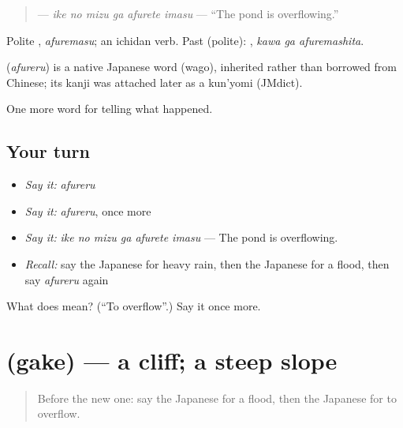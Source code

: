 \begin{quote}
\textbf{  } — \emph{ike no mizu ga afurete imasu} — \textquotedblleft{}The pond is overflowing.\textquotedblright{}
\end{quote}

Polite \textbf{}, \emph{afuremasu}; an ichidan verb. Past (polite): \textbf{ }, \emph{kawa ga afuremashita}.

\begin{cousinweb}
\textbf{} (\emph{afureru}) is a native Japanese word (wago), inherited rather than borrowed from Chinese; its kanji was attached later as a kun'yomi (JMdict).
\end{cousinweb}

\begin{grammarlens}[title={What you've built}]
One more word for telling what happened.
\end{grammarlens}

\subsection*{Your turn}
\begin{itemize}
\raggedright
  \item \emph{Say it:} \emph{afureru}
  \item \emph{Say it:} \emph{afureru}, once more
  \item \emph{Say it:} \emph{ike no mizu ga afurete imasu} — The pond is overflowing.
  \item \emph{Recall:} say the Japanese for heavy rain, then the Japanese for a flood, then say \emph{afureru} again
\end{itemize}

\begin{tcolorbox}[breakable,colback=teal!4,colframe=teal!35!black,title={Before you move on}]
What does  mean? (\textquotedblleft{}To overflow\textquotedblright{}.) Say it once more.
\end{tcolorbox}
\section[\texorpdfstring{\ja{がけ} (gake)}{がけ (gake)}]{ (gake) — a cliff; a steep slope}

\label{lesson:JA-C276-gake}



\begin{quote}
Before the new one: say the Japanese for a flood, then the Japanese for to overflow.
\end{quote}

